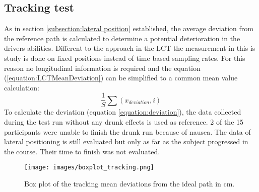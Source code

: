 \subsection{Tracking test}
\label{subsection:evaluation tracking}
As in section \ref{subsection:lateral position} established, the average deviation from the reference path is calculated to determine a potential deterioration in the drivers abilities.
Different to the approach in the LCT \autocite[]{iso201026022} the measurement in this is study is done on fixed positions instead of time based sampling rates. 
For this reason no longitudinal information is required and the equation (\ref{equation:LCTMeanDeviation}) can be simplified to a common mean value calculation: 
\begin{equation}
\label{equation:SimpleMeanDeviation}
	\frac{1}{S}\sum(x_{deviation},i)
\end{equation}
To calculate the deviation (equation \ref{equation:deviation}), the data collected during the test run without any drunk effects is used as reference.
2 of the 15 participants were unable to finish the drunk run because of nausea.
The data of lateral positioning is still evaluated but only as far as the subject progressed in the course.
Their time to finish was not evaluated.

\begin{figure}[h]
    \centering
	\texttt{[image: images/boxplot\_tracking.png]}
	\caption[
		Box plot tracking mean deviations
	]{
		Box plot of the tracking mean deviations from the ideal path in cm.
	}
	\label{figure:boxplotTracking}
\end{figure}


